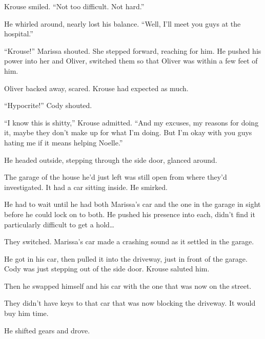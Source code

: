 Krouse smiled.  ``Not too difficult.  Not hard.''



He whirled around, nearly lost his balance.  ``Well, I'll meet you guys at the hospital.''



``Krouse!''  Marissa shouted.  She stepped forward, reaching for him.  He pushed his power into her and Oliver, switched them so that Oliver was within a few feet of him.



Oliver backed away, scared.  Krouse had expected as much.



``Hypocrite!''  Cody shouted.



``I know this is shitty,'' Krouse admitted.  ``And my excuses, my reasons for doing it, maybe they don't make up for what I'm doing.  But I'm okay with you guys hating me if it means helping Noelle.''



He headed outside, stepping through the side door, glanced around.



The garage of the house he'd just left was still open from where they'd investigated.  It had a car sitting inside.  He smirked.



He had to wait until he had both Marissa's car and the one in the garage in sight before he could lock on to both.  He pushed his presence into each, didn't find it particularly difficult to get a hold\ldots



They switched.  Marissa's car made a crashing sound as it settled in the garage.



He got in his car, then pulled it into the driveway, just in front of the garage.  Cody was just stepping out of the side door.  Krouse saluted him.



Then he swapped himself and his car with the one that was now on the street.



They didn't have keys to that car that was now blocking the driveway.  It would buy him time.



He shifted gears and drove.



\sectionbreak



